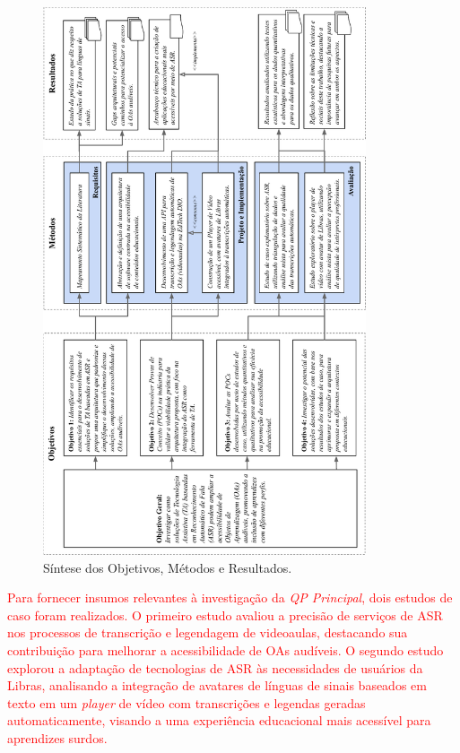 \begin{figure}[htbp]
\caption{Síntese dos Objetivos, Métodos e Resultados.}
\label{chapter5-phd-synthesis}
\centerline{\includegraphics[width=0.85\textwidth]{images/chapter5-phd-synthesis.pdf}}
\fautor
\end{figure}

\textcolor{red}{Para fornecer insumos relevantes à investigação da \textit{QP Principal}, dois estudos de caso foram realizados. O primeiro estudo avaliou a precisão de serviços de ASR nos processos de transcrição e legendagem de videoaulas, destacando sua contribuição para melhorar a acessibilidade de OAs audíveis. O segundo estudo explorou a adaptação de tecnologias de ASR às necessidades de usuários da Libras, analisando a integração de avatares de línguas de sinais baseados em texto em um \textit{player} de vídeo com transcrições e legendas geradas automaticamente, visando a uma experiência educacional mais acessível para aprendizes surdos.}


